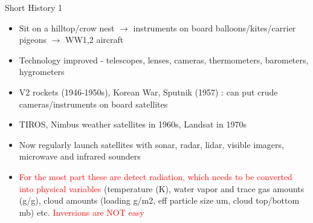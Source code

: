 \documentclass[10pt,t]{beamer}
\begin{document}

\begin{frame}[shrink=2]{Short History 1}
\begin{block}{}
\begin{itemize}
  \item Sit on a hilltop/crow nest $\rightarrow$ instruments on board balloons/kites/carrier pigeons 
   $\rightarrow$ WW1,2 aircraft
  \item Technology improved - telescopes, lenses, cameras, thermometers, barometers, hygrometers
  \item V2 rockets (1946-1950s), Korean War, Sputnik (1957) : can put crude cameras/instruments on board satellites
  \item TIROS, Nimbus weather satellites in 1960s, Landsat in 1970s
  \item Now regularly launch satellites with sonar, radar, lidar, visible imagers, microwave and infrared sounders
  \item \textcolor{red}{For the most part these are detect radiation, which needs to be converted into physical variables}
       (temperature (K), water vapor and trace gas amounts (g/g), cloud amounts (loading g/m2, eff particle size um, 
       cloud top/bottom mb) etc. \textcolor{red}{Inversions are NOT easy}
\end{itemize}  
\end{block}
\end{frame}

\end{document}

